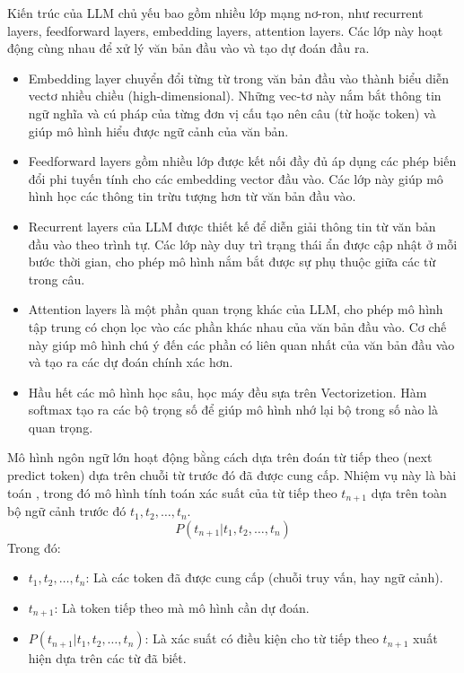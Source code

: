 Kiến trúc của LLM chủ yếu bao gồm nhiều lớp mạng nơ-ron, như recurrent layers, feedforward layers, embedding layers, attention layers. Các lớp này hoạt động cùng nhau để xử lý văn bản đầu vào và tạo dự đoán đầu ra.
\begin{itemize}
    \item Embedding layer chuyển đổi từng từ trong văn bản đầu vào thành biểu diễn vectơ nhiều chiều (high-dimensional). Những vec-tơ này nắm bắt thông tin ngữ nghĩa và cú pháp của từng đơn vị cấu tạo nên câu (từ hoặc token) và giúp mô hình hiểu được ngữ cảnh của văn bản.
    \item Feedforward layers gồm nhiều lớp được kết nối đầy đủ áp dụng các phép biến đổi phi tuyến tính cho các embedding vector đầu vào. Các lớp này giúp mô hình học các thông tin trừu tượng hơn từ văn bản đầu vào.
    \item Recurrent layers của LLM được thiết kế để diễn giải thông tin từ văn bản đầu vào theo trình tự. Các lớp này duy trì trạng thái ẩn được cập nhật ở mỗi bước thời gian, cho phép mô hình nắm bắt được sự phụ thuộc giữa các từ trong câu.
    \item Attention layers là một phần quan trọng khác của LLM, cho phép mô hình tập trung có chọn lọc vào các phần khác nhau của văn bản đầu vào. Cơ chế này giúp mô hình chú ý đến các phần có liên quan nhất của văn bản đầu vào và tạo ra các dự đoán chính xác hơn.
    \item Hầu hết các mô hình học sâu, học máy đều sựa trên Vectorizetion. Hàm softmax tạo ra các bộ trọng số để giúp mô hình nhớ lại bộ trong số nào là quan trọng.
\end{itemize}

Mô hình ngôn ngữ lớn hoạt động bằng cách dựa trên đoán từ tiếp theo (next predict token) dựa trên chuỗi từ trước đó đã được cung cấp. Nhiệm vụ này là bài toán , trong đó mô hình tính toán xác suất của từ tiếp theo $t_{n+1}$ dựa trên toàn bộ ngữ cảnh trước đó $t_1, t_2, \ldots, t_n$.
    \[P(t_{n+1} | t_1, t_2, \ldots, t_n)\]
Trong đó:
\begin{itemize}
    \item $t_1, t_2, \ldots, t_n$: Là các token đã được cung cấp (chuỗi truy vấn, hay ngữ cảnh).
    \item $t_{n+1}$: Là token tiếp theo mà mô hình cần dự đoán.
    \item $P(t_{n+1} | t_1, t_2, \ldots, t_n)$: Là xác suất có điều kiện cho từ tiếp theo $t_{n+1}$ xuất hiện dựa trên các từ đã biết.
\end{itemize}


